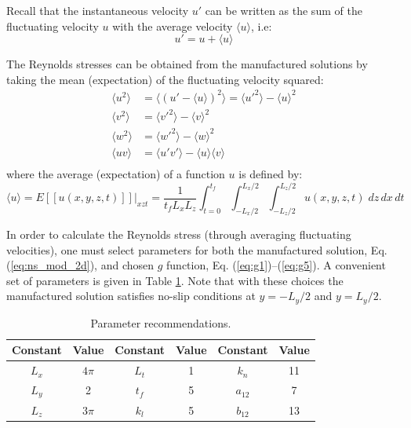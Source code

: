 \documentclass[10pt]{article}
\begin{document}
Recall that the instantaneous velocity $u'$ can be written as the sum of the fluctuating velocity $u$ with the average velocity $\langle u\rangle$, i.e:
$$u'=u+\langle u\rangle$$

The Reynolds stresses can be obtained from the manufactured solutions by taking the mean (expectation) of the fluctuating velocity squared:
\begin{equation}
\begin{split}\label{eq:exp_Reynolds}
\langle u^2\rangle &= \langle (u'-\langle u\rangle)^2 \rangle = \langle{u'}^2\rangle - \langle u\rangle^2 \\
\langle v^2\rangle &= \langle {v'}^2 \rangle - \langle v\rangle^2 \\ 
\langle w^2\rangle &= \langle {w'}^2 \rangle- \langle w\rangle^2 \\
\langle uv \rangle &= \langle u'v' \rangle - \langle u\rangle\langle v\rangle \\  
\end{split}
\end{equation}
where the average (expectation) of a function $u$ is defined by:
\begin{equation}\label{eq:expectation}
\langle u \rangle = E[[u(x,y,z,t)]]\big\rvert_{xzt}= \dfrac{1}{t_f L_x L_z} \int_{t=0}^{t_f} \int_{-L_x/2}^{L_x/2} \int_{-L_z/2}^{L_z/2} u(x,y,z,t) \;dz\,dx\,dt  
\end{equation}


In order to calculate the Reynolds stress (through averaging fluctuating velocities), one must select parameters for both the manufactured solution, Eq. (\ref{eq:ns_mod_2d}), and chosen $g$ function, Eq. (\ref{eq:g1})--(\ref{eq:g5}). A convenient set of parameters is given in Table \ref{table:parameters}. Note that with these choices the manufactured solution satisfies no-slip conditions at $y = -L_y/2$ and $y=L_y/2$.
\begin{table}[htpb]
\caption{Parameter recommendations.}
\vspace{-8pt}
\begin{center}
\begin{tabular}{cc|cc|cc}
\toprule
Constant & Value & Constant & Value & Constant & Value \\
\midrule\midrule
$L_x$	& $4\pi$ & $L_t$  	& 1      & $k_n$ 	& 11 \\
$L_y$	& 2      & $t_f$  	& 5      & $a_{12}$ & 7  \\
$L_z$ 	& $3\pi$ & $k_l$ 	& 5      & $b_{12}$ & 13 \\[0.4ex]
\bottomrule
\end{tabular}
\end{center}
\label{table:parameters}
\end{table}
\end{document}
